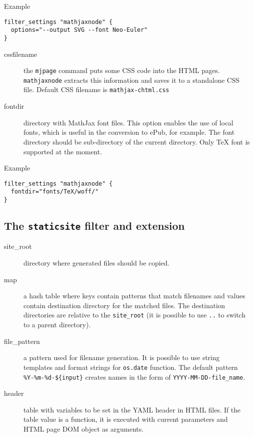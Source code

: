 Example

\begin{verbatim}
filter_settings "mathjaxnode" {
  options="--output SVG --font Neo-Euler"
}
\end{verbatim}

\begin{description}
\item[cssfilename]
the \texttt{mjpage} command puts some CSS code into the HTML pages.
\texttt{mathjaxnode} extracts this information and saves it to a
standalone CSS file. Default CSS filename is \texttt{mathjax-chtml.css}
\item[fontdir]
directory with MathJax font files. This option enables the use of local
fonts, which is useful in the conversion to ePub, for example. The font
directory should be sub-directory of the current directory. Only TeX
font is supported at the moment.
\end{description}

Example

\begin{verbatim}
filter_settings "mathjaxnode" {
  fontdir="fonts/TeX/woff/" 
}
\end{verbatim}

\hypertarget{the-staticsite-filter-and-extension}{%
\subsection{\texorpdfstring{The \texttt{staticsite} filter and
extension}{The staticsite filter and extension}}\label{the-staticsite-filter-and-extension}}

\begin{description}
\item[site\_root]
directory where generated files should be copied.
\item[map]
a hash table where keys contain patterns that match filenames and values
contain destination directory for the matched files. The destination
directories are relative to the \texttt{site\_root} (it is possible to
use \texttt{..} to switch to a parent directory).
\item[file\_pattern]
a pattern used for filename generation. It is possible to use string
templates and format strings for \texttt{os.date} function. The default
pattern \texttt{\%Y-\%m-\%d-\$\{input\}} creates names in the form of
\texttt{YYYY-MM-DD-file\_name}.
\item[header]
table with variables to be set in the YAML header in HTML files. If the
table value is a function, it is executed with current parameters and
HTML page DOM object as arguments.
\end{description}

